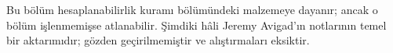 

\begin{editorial}
  Bu bölüm hesaplanabilirlik kuramı bölümündeki malzemeye dayanır; ancak o
  bölüm işlenmemişse atlanabilir. Şimdiki hâli Jeremy Avigad'ın notlarının
  temel bir aktarımıdır; gözden geçirilmemiştir ve alıştırmaları eksiktir.
\end{editorial}












\OLEndChapterHook

